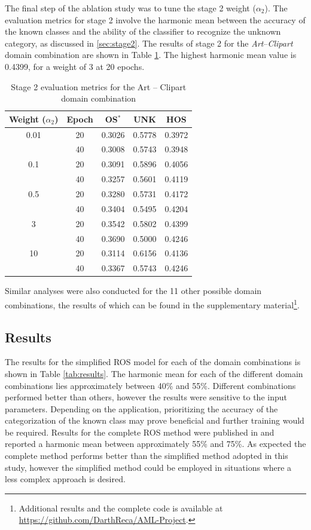 \documentclass[10pt,twocolumn,letterpaper]{article}
\begin{document}
The final step of the ablation study was to tune the stage 2 weight ($\alpha_2$). The evaluation metrics for stage 2 involve the harmonic mean between the accuracy of the known classes and the ability of the classifier to recognize the unknown category, as discussed in \ref{sec:stage2}. The results of stage 2 for the \textit{Art}--\textit{Clipart} domain combination are shown in Table \ref{tab:tuneHOS}. The highest harmonic mean value is 0.4399, for a weight of 3 at 20 epochs.

\begin{table}[!htb]
  \centering
  \begin{tabular}{@{}|ccccc|@{}}
    \hline
 \textbf{Weight ($\alpha_2$}) & \textbf{Epoch} & \textbf{OS$^*$} & \textbf{UNK} & \textbf{HOS} \\
    \hline 
 0.01 & 20 & 0.3026 & 0.5778 & 0.3972 \\
 & 40 & 0.3008 & 0.5743 & 0.3948 \\ \hline
0.1 & 20 & 0.3091 & 0.5896 & 0.4056 \\
 & 40 & 0.3257 & 0.5601 & 0.4119 \\\hline
0.5 & 20 & 0.3280 & 0.5731 & 0.4172 \\
 & 40 & 0.3404 & 0.5495 & 0.4204 \\\hline
3 & 20 & 0.3542 & 0.5802 & 0.4399 \\
 & 40 & 0.3690 & 0.5000 & 0.4246 \\\hline
10 & 20 & 0.3114 & 0.6156 & 0.4136 \\
 & 40 & 0.3367 & 0.5743 & 0.4246 \\
    \hline
  \end{tabular}
  \caption{Stage 2 evaluation metrics for the Art -- Clipart domain combination}
  \label{tab:tuneHOS}
\end{table}

Similar analyses were also conducted for the 11 other possible domain combinations, the results of which can be found in the supplementary material\footnote{Additional results and the complete code is available at \url{https://github.com/DarthReca/AML-Project}.}.


\subsection{Results}

The results for the simplified ROS model for each of the domain combinations is shown in Table \ref{tab:results}. The harmonic mean for each of the different domain combinations lies approximately between 40\% and 55\%. Different combinations performed better than others, however the results were sensitive to the input parameters. Depending on the application, prioritizing the accuracy of the categorization of the known class may prove beneficial and further training would be required.  Results for the complete ROS method were published in \cite{Bucci2020} and reported a harmonic mean between approximately 55\% and 75\%. As expected the complete method performs better than the simplified method adopted in this study, however the simplified method could be employed in situations where a less complex approach is desired.
\end{document}
